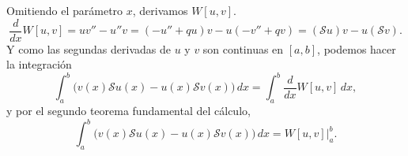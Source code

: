 \documentclass[11pt]{article}
\begin{document}
\begin{Exercise}
\end{Exercise}
\begin{Answer}
	Omitiendo el parámetro $x$, derivamos $W[u, v]$.
	\begin{equation}
		\frac{d}{dx} W[u, v]= uv'' - u''v
		= (-u'' + qu)v - u(-v'' + qv)
		= (\mathcal Su)v - u(\mathcal S v).
	\end{equation}
	Y como las segundas derivadas de $u$ y $v$ son continuas en $[a,b]$, podemos hacer la integración
	\begin{equation}
		\int_{a}^{b}\bigl( v(x)\mathcal Su(x) - u(x)\mathcal S v(x) \bigr) \, dx = \int_{a}^{b}\frac{d}{dx} W[u, v] \, dx,
	\end{equation}
	y por el segundo teorema fundamental del cálculo,
	\begin{equation}
		\int_{a}^{b}\bigl( v(x)\mathcal Su(x) - u(x)\mathcal S v(x) \bigr) \, dx = W[u, v]\bigr\rvert_a^b.
	\end{equation}
\end{Answer}
\end{document}
